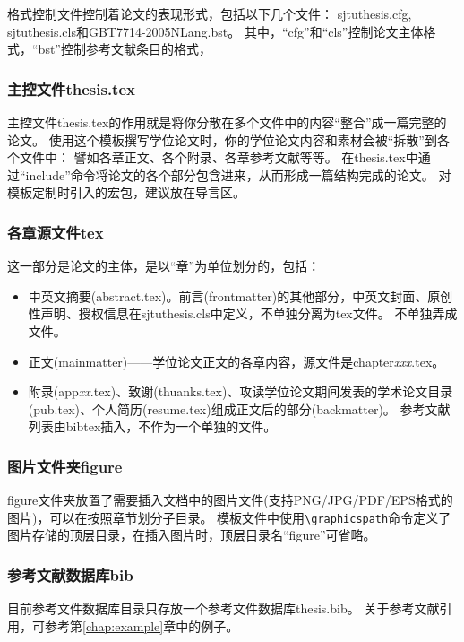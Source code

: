 格式控制文件控制着论文的表现形式，包括以下几个文件：
sjtuthesis.cfg, sjtuthesis.cls和GBT7714-2005NLang.bst。
其中，“cfg”和“cls”控制论文主体格式，“bst”控制参考文献条目的格式，

\subsubsection{主控文件thesis.tex}
\label{sec:thesistex}

主控文件thesis.tex的作用就是将你分散在多个文件中的内容“整合”成一篇完整的论文。
使用这个模板撰写学位论文时，你的学位论文内容和素材会被“拆散”到各个文件中：
譬如各章正文、各个附录、各章参考文献等等。
在thesis.tex中通过“include”命令将论文的各个部分包含进来，从而形成一篇结构完成的论文。
对模板定制时引入的宏包，建议放在导言区。

\subsubsection{各章源文件tex}
\label{sec:thesisbody}

这一部分是论文的主体，是以“章”为单位划分的，包括：

\begin{itemize}[noitemsep,topsep=0pt,parsep=0pt,partopsep=0pt]
	\item 中英文摘要(abstract.tex)。前言(frontmatter)的其他部分，中英文封面、原创性声明、授权信息在sjtuthesis.cls中定义，不单独分离为tex文件。
不单独弄成文件。
	\item 正文(mainmatter)——学位论文正文的各章内容，源文件是chapter\emph{xxx}.tex。
	\item 附录(app\emph{xx}.tex)、致谢(thuanks.tex)、攻读学位论文期间发表的学术论文目录(pub.tex)、个人简历(resume.tex)组成正文后的部分(backmatter)。
参考文献列表由bibtex插入，不作为一个单独的文件。
\end{itemize}

\subsubsection{图片文件夹figure}
\label{sec:fig}

figure文件夹放置了需要插入文档中的图片文件(支持PNG/JPG/PDF/EPS格式的图片)，可以在按照章节划分子目录。
模板文件中使用\verb|\graphicspath|命令定义了图片存储的顶层目录，在插入图片时，顶层目录名“figure”可省略。

\subsubsection{参考文献数据库bib}
\label{sec:bib}

目前参考文件数据库目录只存放一个参考文件数据库thesis.bib。
关于参考文献引用，可参考第\ref{chap:example}章中的例子。

